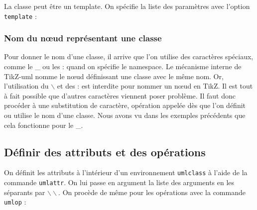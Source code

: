 \documentclass[a4paper,11pt]{report}
\newcommand{\inputTikZ}[1]{%
  }%
\newcommand{\inputTikZ}[1]{%
    \texttt{[image: fig/\#1.pdf]}%
  }%
\newcommand{\tuml}{{\sc TikZ-uml}}
\newcommand{\TikZ}{{\sc TikZ}}
\begin{document}
La classe peut être un template. On spécifie la liste des paramètres avec l'option {\tt template} :

\medskip

\begin{minipage}{0.5\textwidth}

\end{minipage}
\begin{minipage}{0.4\textwidth}
\begin{center}
\inputTikZ{classtemplate}
\end{center}
\end{minipage}

\subsubsection{Nom du n\oe{}ud représentant une classe}

Pour donner le nom d'une classe, il arrive que l'on utilise des caractères spéciaux, comme le \_{} ou les : quand on spécifie le namespace. Le mécanisme interne de \tuml{} nomme le n\oe{}ud définissant une classe avec le même nom. Or, l'utilisation du $\backslash$ et des : est interdite pour nommer un n\oe{}ud en \TikZ. Il est tout à fait possible que d'autres caractères viennent poser problème. Il faut donc procéder à une substitution de caractère, opération appelée dès que l'on définit ou utilise le nom d'une classe. Nous avons vu dans les exemples précédents que cela fonctionne pour le \_{}.

\subsection{Définir des attributs et des opérations}\label{ss.attrop}

On définit les attributs à l'intérieur d'un environnement {\tt umlclass} à l'aide de la commande {\tt umlattr}. On lui passe en argument la liste des arguments en les séparants par $\backslash\backslash$. On procède de même pour les opérations avec la commande {\tt umlop} :

\medskip

\begin{minipage}{0.5\textwidth}

\end{minipage}
\begin{minipage}{0.4\textwidth}
\begin{center}
\inputTikZ{attr-and-op}
\end{center}
\end{minipage}
\end{document}
